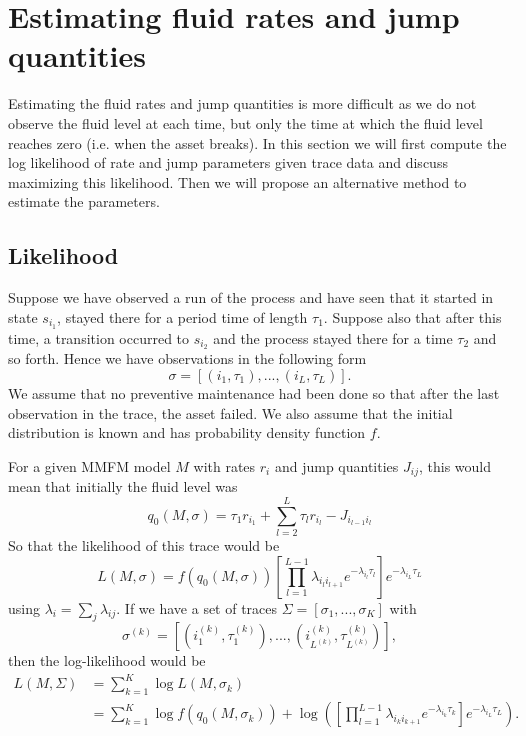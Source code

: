 \section{Estimating fluid rates and jump quantities}
Estimating the fluid rates and jump quantities is more difficult as we do not observe the fluid level at each time, but only the time at which the fluid level reaches zero (i.e. when the asset breaks).
In this section we will first compute the log likelihood of rate and jump parameters given trace data and discuss maximizing this likelihood.
Then we will propose an alternative method to estimate the parameters.

\subsection{Likelihood}
Suppose we have observed a run of the process and have seen that it started in state $s_{i_1}$, stayed there for a period time of length $\tau_1$.
Suppose also that after this time, a transition occurred to $s_{i_2}$ and the process stayed there for a time $\tau_2$ and so forth.
Hence we have observations in the following form
$$
\sigma=\left[(i_1,\tau_1),...,(i_L,\tau_L)\right].
$$
We assume that no preventive maintenance had been done so that after the last observation in the trace, the asset failed.
We also assume that the initial distribution is known and has probability density function $f$.

For a given MMFM model $M$ with rates $r_i$ and jump quantities $J_{ij}$, this would mean that initially the fluid level was
\begin{equation}\label{eq:initialLevelDefinition}
q_0(M,\sigma)=\tau_1r_{i_1}+\sum\limits_{l=2}^{L}\tau_lr_{i_l}-J_{i_{l-1}i_l}
\end{equation}
So that the likelihood of this trace would be
$$
L(M,\sigma)=f(q_0(M,\sigma))\left[\prod\limits_{l=1}^{L-1}\lambda_{i_li_{l+1}}e^{-\lambda_{i_l}\tau_l}\right]e^{-\lambda_{i_L}\tau_L}
$$
using $\lambda_i=\sum_j\lambda_{ij}$.
If we have a set of traces $\Sigma=[\sigma_1,...,\sigma_K]$ with \[
\sigma^{(k)}=\left[(i_1^{(k)},\tau_1^{(k)}),...,(i_{L^{(k)}}^{(k)},\tau_{L^{(k)}}^{(k)})\right],
\]
then the log-likelihood would be
\begin{equation}\label{eq:MmfmLikelihood}
\begin{split}
L(M,\Sigma)&=\sum\limits_{k=1}^K\log L(M,\sigma_k)\\
&=\sum\limits_{k=1}^K\log f(q_0(M,\sigma_k))+\log\left(\left[\prod\limits_{l=1}^{L-1}\lambda_{i_ki_{k+1}}e^{-\lambda_{i_k}\tau_k}\right]e^{-\lambda_{i_L}\tau_L}\right).
\end{split}
\end{equation}

